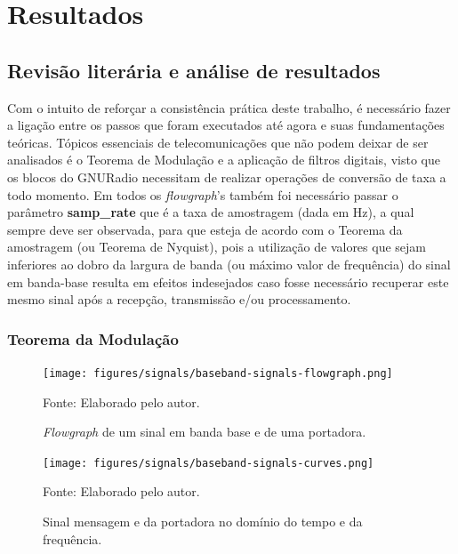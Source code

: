 \documentclass[
  12pt,				%
  openright,			%
  twoside,			%
  a4paper,			%
  english,			%
  french,				%
  spanish,			%
  brazil,				%
  ]{abntex2}
\begin{document}
\part{Resultados}

\chapter{Revisão literária e análise de resultados}

Com o intuito de reforçar a consistência prática deste trabalho, é necessário fazer a ligação entre os passos que foram executados até agora e suas fundamentações teóricas. Tópicos essenciais
de telecomunicações que não podem deixar de ser analisados é o Teorema de Modulação e a aplicação de filtros digitais, visto que os blocos do GNURadio necessitam de realizar operações de
conversão de taxa a todo momento.
Em todos os \textit{flowgraph}'s também foi necessário passar o parâmetro \textbf{samp\_rate} que é a taxa de amostragem (dada em Hz), a qual sempre deve ser observada, para que esteja de acordo com o
Teorema da amostragem (ou Teorema de Nyquist), pois a utilização de valores que sejam inferiores ao dobro da largura de banda (ou máximo valor de frequência) do sinal em banda-base resulta em
efeitos indesejados caso fosse necessário recuperar este mesmo sinal após a recepção, transmissão e/ou processamento.

\section*{Teorema da Modulação}

\begin{figure}[!htb]
  \centering
  \caption{\textit{Flowgraph} de um sinal em banda base e de uma portadora.}
  \texttt{[image: figures/signals/baseband-signals-flowgraph.png]}

  Fonte: Elaborado pelo autor.
  \label{fig:baseband_flowgraph}
\end{figure}

\begin{figure}[!htb]
  \centering
  \caption{Sinal mensagem e da portadora no domínio do tempo e da frequência.}
  \texttt{[image: figures/signals/baseband-signals-curves.png]}

  Fonte: Elaborado pelo autor.
  \label{fig:baseband_curves}
\end{figure}
\end{document}

